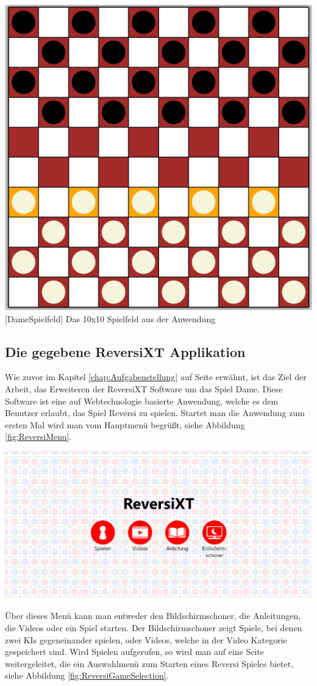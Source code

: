 \documentclass[12pt,a4paper,bibliography=totocnumbered,listof=totocnumbered]{article}
\begin{document}
\vspace{1em}
\begin{minipage}{\linewidth}
	\centering
	\includegraphics[width=0.5\linewidth]{pics/checkersboard.png}
	[DameSpielfeld]{ Das 10x10 Spielfeld aus der Anwendung }
	\label{fig:checkersboard}
\end{minipage}

\subsection{Die gegebene ReversiXT Applikation}
\label{chap:gegebeneApp}
Wie zuvor im Kapitel \ref{chap:Aufgabenstellung} auf Seite \pageref{chap:Aufgabenstellung} erwähnt, ist das Ziel der Arbeit, das Erweiteren
der ReversiXT Software um das Spiel Dame. Diese Software ist eine auf Webtechnologie basierte Anwendung, welche es dem Benutzer erlaubt,
das Spiel Reversi zu spielen. Startet man die Anwendung zum ersten Mal wird man vom Hauptmenü begrüßt, siehe Abbildung \ref{fig:ReversiMenu}.


\vspace{1em}
\begin{minipage}{\linewidth}
	\centering
	\includegraphics[width=0.7\linewidth]{pics/ReversiMenues.png}
	\label{fig:ReversiMenu}
\end{minipage}

Über dieses Menü kann man entweder den Bildschirmschoner, die Anleitungen, die Videos oder ein Spiel starten. Der Bildschirmschoner 
zeigt Spiele, bei denen zwei KIs gegeneinander spielen, oder Videos, welche in der Video Kategorie gespeichert sind. Wird Spielen aufgerufen, 
so wird man auf eine Seite weitergeleitet, die ein Auswahlmenü zum Starten eines Reversi Spieles bietet, siehe Abbildung \ref{fig:ReversiGameSelection}.
\end{document}
